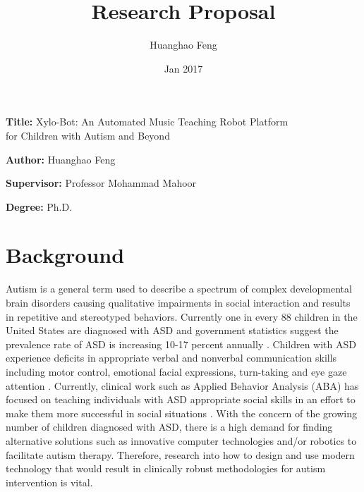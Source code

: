 \documentclass[12pt, a4paper]{article}
\title{Research Proposal}
\author{Huanghao Feng}
\date{Jan 2017}
\newcommand{\namelistlabel}[1]{\mbox{#1}\hfil}
\newenvironment{namelist}[1]{%
\begin{list}{}
    {
        \let\makelabel\namelistlabel
        \settowidth{\labelwidth}{#1}
        \setlength{\leftmargin}{1.1\labelwidth}
    }
  }{%
\end{list}}
\begin{document}
\maketitle

\begin{namelist}{xxxxxxxxxxxx}
\item[{\bf Title:}]
	Xylo-Bot: An Automated Music Teaching Robot Platform \\
	for Children with Autism and Beyond
\item[{\bf Author:}]
	Huanghao Feng
\item[{\bf Supervisor:}]
	Professor Mohammad Mahoor
\item[{\bf Degree:}]
	Ph.D.
\end{namelist}

\section*{Background} 
Autism is a general term used to describe a spectrum of complex developmental
brain disorders causing qualitative impairments in social interaction and results in
repetitive and stereotyped behaviors. Currently one in every 88 children in the United
States are diagnosed with ASD and government statistics suggest the prevalence rate of
ASD is increasing 10-17 percent annually \cite{Fetch2002}. Children with ASD experience deficits in
appropriate verbal and nonverbal communication skills including motor control, emotional
facial expressions, turn-taking and eye gaze attention \cite{RobotPlaymate2002}. Currently, clinical work such as Applied
Behavior Analysis (ABA) \cite{RollingRobot2002, MobileRobotic2002} has focused on teaching individuals with ASD
appropriate social skills in an effort to make them more successful in social situations \cite{Behavioral1964}.
With the concern of the growing number of children diagnosed with ASD, there is a high
demand for finding alternative solutions such as innovative computer technologies and/or
robotics to facilitate autism therapy. Therefore, research into how to design and use modern
technology that would result in clinically robust methodologies for autism intervention is
vital.\\
\end{document}
